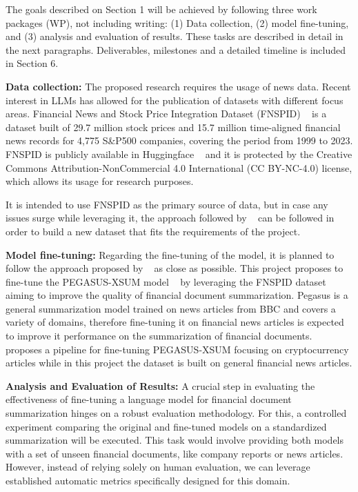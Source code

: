 The goals described on Section 1 will be achieved by following three work packages (WP), not including writing: (1) Data
collection, (2) model fine-tuning, and (3) analysis and evaluation of results.
These tasks are described in detail in the next paragraphs.
Deliverables, milestones and a detailed timeline is included in Section 6.

\textbf{Data collection:}
The proposed research requires the usage of news data.
Recent interest in LLMs has allowed for the publication of datasets with different focus areas.
Financial News and Stock Price Integration Dataset (FNSPID) ~\cite{Dong2024} is a dataset built of 29.7 million stock
prices and 15.7 million time-aligned financial news records for 4,775 S&P500 companies, covering the period from 1999 to
2023.
FNSPID is publicly available in Huggingface ~\cite{Dong2024} and it is protected by the Creative Commons
Attribution-NonCommercial 4.0 International (CC BY-NC-4.0) license, which allows its usage for research purposes.

It is intended to use FNSPID as the primary source of data, but in case any issues surge while leveraging it, the
approach followed by ~\cite{Dong2024} can be followed in order to build a new dataset that fits the requirements of the
project.


\textbf{Model fine-tuning:}
Regarding the fine-tuning of the model, it is planned to follow the approach proposed by ~\cite{Avramelou2023} as close
as possible.
This project proposes to fine-tune the PEGASUS-XSUM model ~\cite{Zhang2019} by leveraging the FNSPID dataset aiming to
improve the quality of financial document summarization.
Pegasus is a general summarization model trained on news articles from BBC and covers a variety of domains, therefore
fine-tuning it on financial news articles is expected to improve it performance on the summarization of financial documents.
~\cite{Avramelou2023} proposes a pipeline for fine-tuning PEGASUS-XSUM focusing on cryptocurrency articles while in this
project the dataset is built on general financial news articles.


\textbf{Analysis and Evaluation of Results:}
A crucial step in evaluating the effectiveness of fine-tuning a language model for financial document summarization
hinges on a robust evaluation methodology.
For this, a controlled experiment comparing the original and fine-tuned models on a standardized summarization will be
executed.
This task would involve providing both models with a set of unseen financial documents, like company reports or news
articles.
However, instead of relying solely on human evaluation, we can leverage established automatic metrics specifically
designed for this domain.

